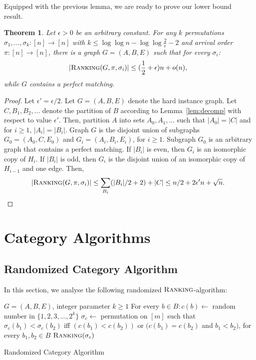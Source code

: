 \documentclass[a4paper]{article}
\newcommand{\Rank}{\textsc{Ranking}}
\newtheorem{theorem}{Theorem}
\begin{document}
Equipped with the previous lemma, we are ready to prove our lower bound result.
\begin{theorem} \label{thm:lb-ranking}
 Let $\epsilon > 0$ be an arbitrary constant. For any $k$
 permutations $\sigma_1, \dots, \sigma_k: [n] \rightarrow [n]$ with
$k \le \log \log n - \log \log \frac{2}{\epsilon} -2$ and arrival order $\pi: [n] \rightarrow [n]$,
there is a graph $G = (A, B, E)$ such that for every $\sigma_i$:
$$|\Rank(G, \pi, \sigma_i)| \le (\frac{1}{2} + \epsilon) n + o(n), $$
while $G$ contains a perfect matching.
\end{theorem}
\begin{proof}
Let $\epsilon' = \epsilon / 2$.
Let $G = (A, B, E)$ denote the hard instance graph.
Let $C,  B_1, B_2, \dots$ denote the partition of $B$ according to Lemma~\ref{lem:decomp} with
respect to value $\epsilon'$.
Then, partition $A$ into sets $A_0, A_1, \dots$ such that $|A_0| = |C|$ and for
$i \ge 1$,  $|A_i| = |B_i|$. Graph $G$ is the disjoint union of subgraphs
$G_0 = (A_0, C, E_0)$ and $G_i = (A_i, B_i, E_i)$, for $i \ge 1$. Subgraph $G_0$
is an arbitrary graph that contains a perfect matching. If $|B_i|$ is even, then
$G_i$ is an isomorphic copy of $H_i$. If $|B_i|$ is odd, then
$G_i$ is the disjoint union of an isomorphic copy of $H_{i-1}$ and one edge.
Then,
 $$|\Rank(G, \pi, \sigma_i)| \le \sum_{B_i} (|B_i|/2 + 2) + |C| \le n/2 + 2 \epsilon' n + \sqrt{n}. $$
\end{proof}


\section{Category Algorithms} \label{sec:cat-algos}
\subsection{Randomized Category Algorithm} \label{sec:rand-cat}
In this section, we analyse the following randomized $\Rank$-algorithm:
\begin{algorithm}[H]
 \begin{algorithmic}
  \REQUIRE $G = (A, B, E)$, integer parameter $k \ge 1$
  \STATE For every $b \in B: c(b) \gets $ random number in $\{1, 2, 3, \dots, 2^k\}$
  \STATE $\sigma_c \gets $ permutation on $[m]$ such that $\sigma_c(b_1) < \sigma_c(b_2)$ iff
  $\left( c(b_1) < c(b_2) \right)$ or $( c(b_1) = c(b_2) $  and $b_1 < b_2)$, for every $b_1, b_2 \in B$
  \RETURN $\Rank(\sigma_c)$
 \end{algorithmic}
 \caption{Randomized Category Algorithm \label{alg:rand}}
\end{algorithm}
\end{document}
